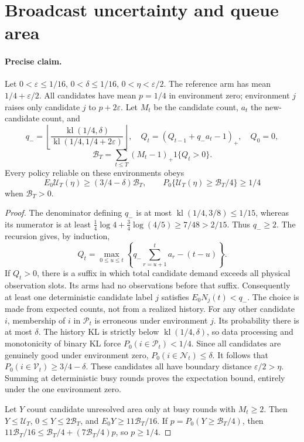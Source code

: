 \section{Broadcast uncertainty and queue area}
\label{app:broadcast}

\paragraph{Precise claim.}
Let $0<\varepsilon\le1/16$, $0<\delta\le1/16$,
$0<\eta<\varepsilon/2$. The reference arm has mean
$1/4+\varepsilon/2$. All candidates have mean $p=1/4$ in environment zero;
environment $j$ raises only candidate $j$ to $p+2\varepsilon$. Let $M_t$ be
the candidate count, $a_t$ the new-candidate count, and
\[
 q_- =\left\lfloor\frac{\operatorname{kl}(1/4,\delta)}
                         {\operatorname{kl}(1/4,1/4+2\varepsilon)}\right\rfloor,
 \quad Q_t=(Q_{t-1}+q_-a_t-1)_+,\quad Q_0=0,
\]
\[
 \mathcal B_T=\sum_{t\le T}(M_t-1)_+1\{Q_t>0\}.
\]
Every policy reliable on these environments obeys
\[
 E_0\mathcal U_T(\eta)\ge(3/4-\delta)\mathcal B_T,
 \qquad
 P_0\{\mathcal U_T(\eta)\ge\mathcal B_T/4\}\ge1/4
\]
when $\mathcal B_T>0$.

\begin{proof}
The denominator defining $q_-$ is at most
$\operatorname{kl}(1/4,3/8)\le1/15$, whereas its numerator is at least
$\frac14\log4+\frac34\log(4/5)\ge7/48>2/15$. Thus $q_-\ge2$.
The recursion gives, by induction,
\[
 Q_t=\max_{0\le u\le t}\left\{
       q_-\sum_{r=u+1}^ta_r-(t-u)\right\}.
\]
If $Q_t>0$, there is a suffix in which total candidate demand exceeds all
physical observation slots. Its arms had no observations before that suffix.
Consequently at least one deterministic candidate label $j$ satisfies
$E_0N_j(t)<q_-$. The choice is made from expected counts, not from a realized
history. For any other candidate $i$, membership of $i$ in $\mathcal P_t$ is erroneous
under environment $j$. Its probability there is at most $\delta$.
The history KL is strictly below $\operatorname{kl}(1/4,\delta)$, so data
processing and monotonicity of binary KL force $P_0(i\in \mathcal P_t)<1/4$.
Since all candidates are genuinely good under environment zero,
$P_0(i\in \mathcal N_t)\le\delta$. It follows that
$P_0(i\in \mathcal V_t)\ge3/4-\delta$. These candidates all have boundary distance
$\varepsilon/2>\eta$. Summing at deterministic busy rounds proves the
expectation bound, entirely under the one environment zero.

Let $Y$ count candidate unresolved area only at busy rounds with $M_t\ge2$.
Then $Y\le\mathcal U_T$, $0\le Y\le2\mathcal B_T$, and
$E_0Y\ge11\mathcal B_T/16$. If
$p=P_0(Y\ge\mathcal B_T/4)$, then
$11\mathcal B_T/16\le\mathcal B_T/4+(7\mathcal B_T/4)p$, so $p\ge1/4$.
\end{proof}

